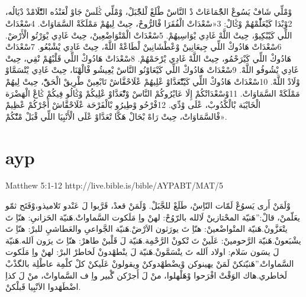 \documentclass[12pt,fleqn,titlepage,twoside,a4paper]{book}
\begin{document}
\begin{arab}[utf]
\section*{}


وْمْلِّي شَافْ يَسُوعْ الجّْمَاعَاتْ دْ النَّاسْ طْلَعْ لْلجّْبَلْ، وْمْلِّي ݣْلَسْ جَاوْ لْعَنْدُه التّْلَامْدْ دْيَالُه، 2وْبْدَا كَيْعَلّْمْهُمْ وْݣَالْ:
3«سْعْدَاتْ الْفُقَرَا فْالرُّوحْ،
حِيتْ لِيهُمْ مَمْلَكَةْ السَّمَاوَاتْ.
4سْعْدَاتْ اللِّي كَيْبْكِيوْ، حِيتْ اللَّهْ غَادِي يْوَاسِيهُمْ.
5سْعْدَاتْ الْمْتْوَاضْعِينْ، حِيتْ غَادِي يْوَرْتُو الْأَرْضْ.
6سْعْدَاتْ هَادُوكْ اللِّي جِيعَانِينْ وْعْطْشَانِينْ لْطَاعْةْ اللَّهْ، حِيتْ غَادِي يْشْبْعُو.
7سْعْدَاتْ هَادُوكْ اللِّي كَيْرَحْمُو، حِيتْ اللَّهْ غَادِي يْرْحَمْهُمْ.
8سْعْدَاتْ هَادُوكْ اللِّي قَلْبْهُمْ نْقِي، حِيتْ غَادِي يْشُوفُو اللَّهْ.
9سْعْدَاتْ هَادُوكْ اللِّي كَيْعَاوْنُو النَّاسْ يْعِيشُو فْالْهْنَا، حِيتْ غَادِي يْتْسَمَّاوْ وْلَادْ اللَّهْ.
10سْعْدَاتْ هَادُوكْ اللِّي كَيْتّْعَدَّاوْ عْلِيهُمْ عْلَاحْقَّاشْ تَابْعِينْ طْرِيقْ الْحَقّْ، حِيتْ لِيهُمْ مَمْلَكَةْ السَّمَاوَاتْ.
11وْسْعْدَاتْكُمْ إِلَا عَايْرُوكُمْ النَّاسْ وْتّْعَدَّاوْ عْلِيكُمْ وْݣَالُو فِيكُمْ ݣَاعْ الْهَضْرَة الْخَايْبَة بْالْكْدُوبْ، عْلَى وْدِّي. 12فْرْحُو وْطِيرُو بْالْفَرْحَة عْلَاحْقَّاشْ أَجْرْكُمْ عْظِيمْ فْالسَّمَاوَاتْ، حِيتْ رَاهْ بْحَالْ هَكَّا تْعَدَّاوْ عْلَى الْأَنْبِيَا اللِّي قْبَلْ مْنّْكُمْ».
\end{arab}

\section{ayp}

Matthew 5:1-12 http://live.bible.is/bible/AYPABT/MAT/5

\begin{arab}[utf]

وْلَمَنْ أَرى يَسوُعْ لَمّات النّاِسْ، طَلَعْ للجَّبَلْ. وْلَمَنْ قعدْ، قَرَّبوا لَ عَنْدو تَلاميذو،وْفَتَح ثمّو يعَلّمنْ، قالْ:”هَنيّة المحْتازينْ لَالله بالرّوُحْ: لهنْ واِ مَلَكوت السَّماواتْ.هَنيّة الحَزانىِ: هنّاِ تَ يتْعَزَّونْ.هَنيّة المتْواضْعينْ: هنّاِ تَ يورَثون الاَرْضْ.هَنيّة الجَّواعىِ والعَطاشيِ للبرْ: هنّاِ تَ يشْبَعونْ.هَنيّة الرَّحومينْ: عَلَينْ تَ تْكونْ الرَّحْمِة.هَنيّة لَ قَلْبنْ طاهرْ: هنّاِ تَ يرَون اَلله.هَنيّة لَ يسَون سَلام: اولاد اَلله تَ يتْسَمَّونْ.هَنيّة لَ ينْطهْدونْ لَخاطرْ البرْ: لهنْ واِ مَلَكوت السَّماواتْ.”هَنيّتكنْ لَمَنْ يهينوكن وْيضْطهْدوكنْ ويقولونْ عَلَيكنْ كلْ كلْمِة عاطْلِة بالگذْبْ لَخاطري.هاك الوَقْتْ افْرَحوا وْهَلْهلوا، منْ لَ أَجرْكن گْبير واِ ف السَّماواتْ، منْ لَ كذاِ اضْطَهَدوا الاَنْبِيا قَبلْكنْ.
\end{arab}
\end{document}
